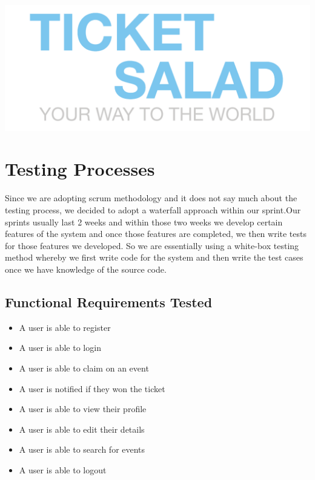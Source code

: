 \documentclass[12pt]{article}
\begin{document}
\begin{titlepage}
	
	
	
	\includegraphics{logo.png}\\[1cm] %
	 
	
	\vfill %
	
	\end{titlepage}
	
	\section{Testing Processes}
	Since we are adopting scrum methodology and it does not say much about the testing process, we decided to adopt a waterfall approach within our sprint.Our sprints usually last 2 weeks and within those two weeks we develop certain features of the system and once those features are completed, we then write tests for those features we developed. So we are essentially using a white-box testing method whereby we first write code for the system and then write the test cases once we have knowledge of the source code.
	
	\subsection{Functional Requirements Tested}
	\begin{itemize}
		\item A user is able to register
		\item A user is able to login
		\item A user is able to claim on an event
		\item A user is notified if they won the ticket
		\item A user is able to view their profile
		\item A user is able to edit their details
		\item A user is able to search for events
		\item A user is able to logout
	\end{itemize}
	
\end{document}
